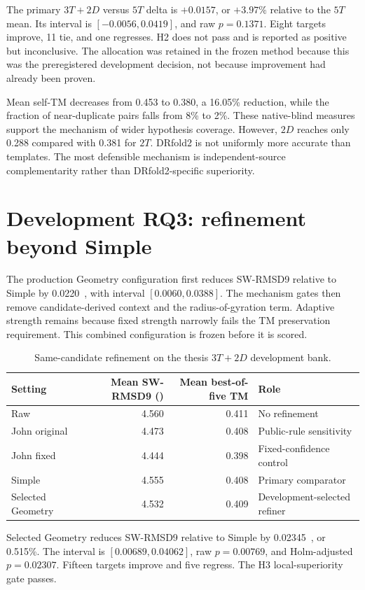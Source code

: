 \documentclass[12pt,a4paper,oneside]{report}
\newcommand{\angstrom}{\text{\AA}}
\begin{document}
The primary $3T+2D$ versus $5T$ delta is $+0.0157$, or $+3.97\%$ relative to the
$5T$ mean. Its interval is $[-0.0056,0.0419]$, and raw $p=0.1371$. Eight targets
improve, 11 tie, and one regresses. H2 does not pass and is reported as positive but
inconclusive. The allocation was retained in the frozen method because this was the
preregistered development decision, not because improvement had already been proven.

Mean self-TM decreases from 0.453 to 0.380, a 16.05\% reduction, while the fraction of
near-duplicate pairs falls from 8\% to 2\%. These native-blind measures support the
mechanism of wider hypothesis coverage. However, $2D$ reaches only 0.288 compared with
0.381 for $2T$. DRfold2 is not uniformly more accurate than templates. The most
defensible mechanism is independent-source complementarity rather than DRfold2-specific
superiority.

\section{Development RQ3: refinement beyond Simple}

The production Geometry configuration first reduces SW-RMSD9 relative to Simple by
0.0220~\angstrom{}, with interval $[0.0060,0.0388]$. The mechanism gates then remove
candidate-derived context and the radius-of-gyration term. Adaptive strength remains
because fixed strength narrowly fails the TM preservation requirement. This combined
configuration is frozen before it is scored.

\begin{table}[H]
\centering
\caption{Same-candidate refinement on the thesis $3T+2D$ development bank.}
\begin{tabularx}{\textwidth}{XrrX}
\toprule
Setting & Mean SW-RMSD9 (\angstrom) & Mean best-of-five TM & Role \\
\midrule
Raw & 4.560 & 0.411 & No refinement \\
John original & 4.473 & 0.408 & Public-rule sensitivity \\
John fixed & 4.444 & 0.398 & Fixed-confidence control \\
Simple & 4.555 & 0.408 & Primary comparator \\
Selected Geometry & 4.532 & 0.409 & Development-selected refiner \\
\bottomrule
\end{tabularx}
\end{table}

Selected Geometry reduces SW-RMSD9 relative to Simple by 0.02345~\angstrom{}, or
0.515\%. The interval is $[0.00689,0.04062]$, raw $p=0.00769$, and Holm-adjusted
$p=0.02307$. Fifteen targets improve and five regress. The H3 local-superiority gate
passes.
\end{document}
